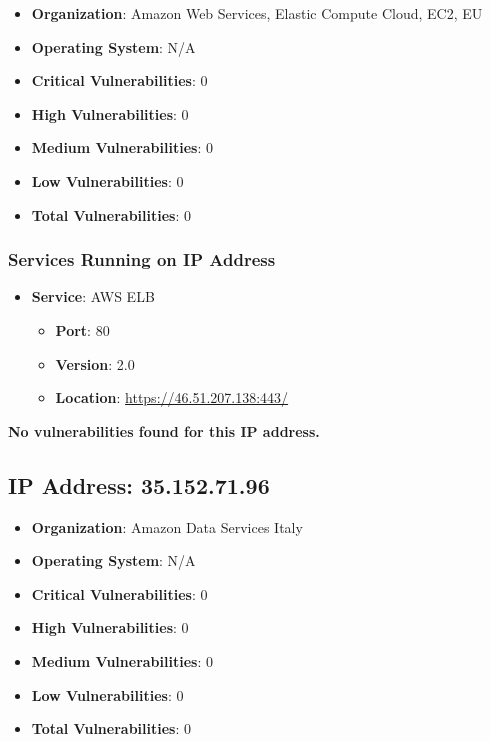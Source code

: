 \documentclass{article}
\begin{document}
\begin{itemize}
    \item \textbf{Organization}: Amazon Web Services, Elastic Compute Cloud, EC2, EU
    \item \textbf{Operating System}:  N/A 
    \item \textbf{Critical Vulnerabilities}: 0
    \item \textbf{High Vulnerabilities}: 0
    \item \textbf{Medium Vulnerabilities}: 0
    \item \textbf{Low Vulnerabilities}: 0
    \item \textbf{Total Vulnerabilities}: 0
\end{itemize}

\subsubsection*{Services Running on IP Address}

\begin{itemize}
    
        \item \textbf{Service}: AWS ELB
        \begin{itemize}
            \item \textbf{Port}: 80
            \item \textbf{Version}:  2.0 
            \item \textbf{Location}: \href{ https://46.51.207.138:443/ }{ https://46.51.207.138:443/ }
        \end{itemize}
    
\end{itemize}


\textbf{No vulnerabilities found for this IP address.}




\clearpage



\subsection*{IP Address: 35.152.71.96}

\begin{itemize}
    \item \textbf{Organization}: Amazon Data Services Italy
    \item \textbf{Operating System}:  N/A 
    \item \textbf{Critical Vulnerabilities}: 0
    \item \textbf{High Vulnerabilities}: 0
    \item \textbf{Medium Vulnerabilities}: 0
    \item \textbf{Low Vulnerabilities}: 0
    \item \textbf{Total Vulnerabilities}: 0
\end{itemize}
\end{document}
